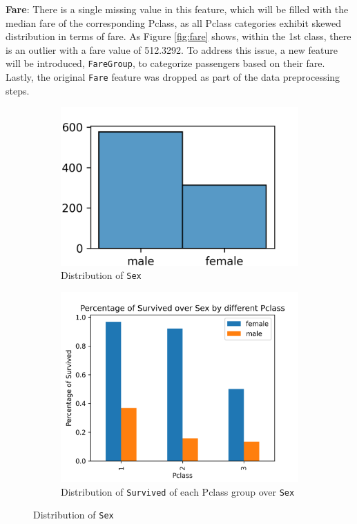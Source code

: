 \documentclass[10pt]{article}
\begin{document}
\textbf{Fare}: There is a single missing value in this feature, which will be filled with the median fare of the corresponding Pclass, as all Pclass categories exhibit skewed distribution in terms of fare. As Figure \ref{fig:fare} shows, within the 1st class, there is an outlier with a fare value of 512.3292. To address this issue, a new feature will be introduced, \texttt{FareGroup}, to categorize passengers based on their fare. Lastly, the original \texttt{Fare} feature was dropped as part of the data preprocessing steps.

\begin{figure}[!htbp]
    \centering
    \begin{subfigure}[b]{0.49\textwidth}
        \centering
        \includegraphics[width=\textwidth]{../hw1/img/Part_II/distribution_of_sex.png}
        \caption{Distribution of \texttt{Sex}}
        \label{fig:sex_distribution}
    \end{subfigure}
    \hfill
    \begin{subfigure}[b]{0.49\textwidth}
        \centering
        \includegraphics[width=\textwidth]{../hw1/img/Part_II/distribution_of_sex_by_pclass.png}
        \caption{Distribution of \texttt{Survived} of each Pclass group over \texttt{Sex}}
        \label{fig:sex_vs_pclass}
    \end{subfigure}
    \caption{Distribution of \texttt{Sex}}
    \label{fig:sex}
\end{figure}
\end{document}
